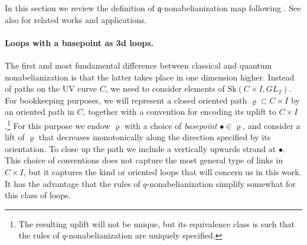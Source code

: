 \documentclass{article}
\numberwithin{equation}{section}
\newcommand{\mq}{\mathfrak{q}}
\newcommand{\Sk}{\mathrm{Sk}}
\begin{document}
In this section we review the definition of $\mq$-nonabelianization map following \cite{Neitzke:2020jik} .
See also \cite{Galakhov:2014xba, Gabella:2016zxu, Neitzke:2021gxr, Ekholm:2025anq, Hollands:2026rhz} for related works and applications.

\paragraph{Loops with a basepoint as 3d loops.}
The first and most fundamental difference between classical and quantum nonabelianization is that the latter takes place in one dimension higher. Instead of paths on the UV curve $C$, we need to consider elements of $\Sk(C\times I,GL_2)$. 
For bookkeeping purposes, we will represent a closed oriented path $\varrho\subset C\times I$ by an oriented path in $C$, together with a convention for encoding its uplift to $C\times I$.\footnote{The resulting uplift will not be unique, but its equivalence class is such that the rules of $q$-nonabelianization are uniquely specified.} 
For this purpose we endow $\varrho$ with a choice of \textit{basepoint} $\bullet\in \varrho$, and consider a lift of $\varrho$ that decreases monotonically along the direction specified by its orientation. To close up the path we include a vertically upwards strand at $\bullet$. 
This choice of conventions does not capture the most general type of links in $C\times I$, but it captures the kind or oriented loops that will concern us in this work. It has the advantage that the rules of $q$-nonabelianization simplify somewhat for this class of loops. 
\end{document}
